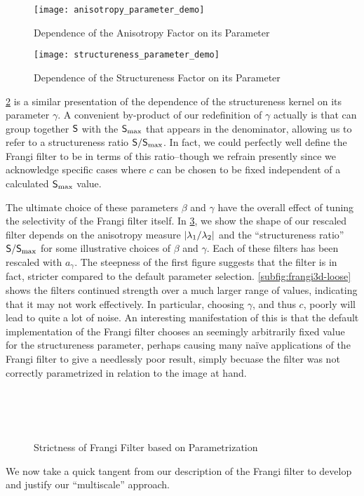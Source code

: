 \begin{figure}[t] \centering
  \texttt{[image: anisotropy\_parameter\_demo]}
  \caption{Dependence of the Anisotropy Factor on its Parameter}
  \label{fig:anisotropy-parameter-demo}
\end{figure}

\begin{figure}[t] \centering
  \texttt{[image: structureness\_parameter\_demo]}
  \caption{Dependence of the Structureness Factor on its Parameter}
  \label{fig:structureness-parameter-demo}
\end{figure}

\cref{fig:structureness-parameter-demo} is a similar presentation of the dependence of the structureness kernel on its parameter $\gamma$.
A convenient by-product of our redefinition of $\gamma$ actually is that can group together $\mathsf{S}$ with the $\mathsf{S}_{\max}$ that appears in the denominator, allowing us to refer to a structureness ratio $\mathsf{S}/\mathsf{S}_{\max}$. In fact, we could perfectly well define the Frangi filter to be in terms of this ratio--though we refrain presently since we acknowledge specific cases where $c$ can be chosen to be fixed independent of a calculated $\mathsf{S}_{\max}$ value.


The ultimate choice of these parameters $\beta$ and $\gamma$ have the overall effect of tuning the selectivity of the Frangi filter itself. In \cref{fig:frangi3d-selection}, we show the shape of our rescaled filter depends on the anisotropy measure $\vert\lambda_1 / \lambda_2\vert$ and the ``structureness ratio'' $\mathsf{S}/\mathsf{S}_{\max}$ for some illustrative choices of $\beta$ and $\gamma$. Each of these filters has been rescaled with $a_\gamma$. The steepness of the first figure suggests that the filter is in fact, stricter compared to the default parameter selection. \cref{subfig:frangi3d-loose} shows the filters continued strength over a much larger range of values, indicating that it may not work effectively. In particular, choosing $\gamma$, and thus $c$, poorly will lead to quite a lot of noise.
An interesting manifestation of this is that the default implementation of the Frangi filter \cite{scipy} chooses an seemingly arbitrarily fixed value for the structureness parameter, perhaps causing many na\"ive applications of the Frangi filter to give a needlessly poor result, simply becuase the filter was not correctly parametrized in relation to the image at hand.

\begin{figure}[t] \centering
\subfloat[Strict]{\texttt{[image: 4-rs]}} \label{subfig:frangi3d-strict} \\
\subfloat[Standard]{\texttt{[image: 14-rs]}} \label{subfig:frangi3d-default} \\
 \label{subfig:frangi3d-loose} \\
\caption{Strictness of Frangi Filter based on Parametrization}
\label{fig:frangi3d-selection}
\end{figure}



	We now take a quick tangent from our description of the Frangi filter to develop and justify our ``multiscale'' approach.
	
